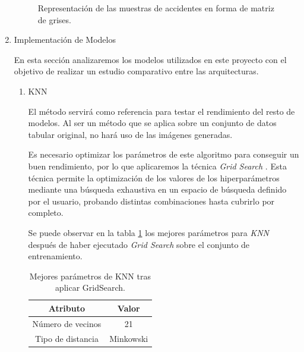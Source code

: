 \begin{enumerate}
\begin{figure}[H]
                \caption{Representación de las muestras de accidentes en forma de matriz de grises.}
                \label{SampledImagesExampleImage}
            \end{figure}
 
        \item Implementación de Modelos

            En esta sección analizaremos los modelos utilizados en este proyecto con el objetivo de realizar un estudio comparativo entre las arquitecturas.


            \begin{enumerate}

                \item KNN

                    El método  servirá como referencia para testar el rendimiento del resto de modelos. Al ser un método que se aplica sobre un conjunto de datos tabular original, no hará uso de las imágenes generadas.

                    Es necesario optimizar los parámetros de este algoritmo para conseguir un buen rendimiento, por lo que aplicaremos la técnica \textit{Grid Search} \cite{GridSearchSklearnLibrary}. Esta técnica permite la optimización de los valores de los hiperparámetros mediante una búsqueda exhaustiva en un espacio de búsqueda definido por el usuario, probando distintas combinaciones hasta cubrirlo por completo. 


                    Se puede observar en la tabla \ref{BestParamsKNNGridSearchTable} los mejores parámetros para \textit{KNN} después de haber ejecutado \textit{Grid Search} sobre el conjunto de entrenamiento.\\

                    \begin{table}[H]
                        \centering
                        \begin{tabular}{ |c|c| }
                            \hline
                            Atributo & Valor\\
                            \hline
                                Número de vecinos & 21 \\ 
                                Tipo de distancia & Minkowski \\ 
                            \hline
                        \end{tabular}
                        \caption{Mejores parámetros de KNN tras aplicar GridSearch.}
                        \label{BestParamsKNNGridSearchTable}
                    \end{table}



\end{enumerate}
\end{enumerate}
